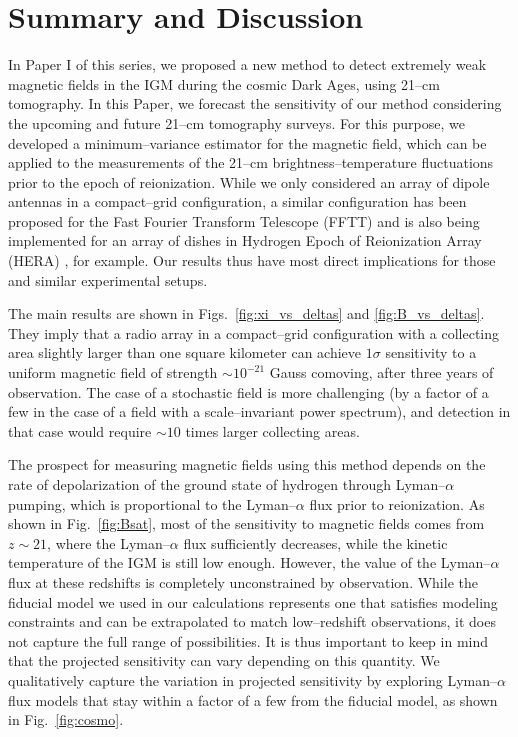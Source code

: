 \section{Summary and Discussion}
\label{sec:conclusions}

In Paper I of this series, we proposed a new method to detect extremely weak magnetic fields in the IGM during the cosmic Dark Ages, using 21--cm tomography. In this Paper, we forecast the sensitivity of our method considering the upcoming and future 21--cm tomography surveys. For this purpose, we developed a minimum--variance estimator for the magnetic field, which can be applied to the measurements of the 21--cm brightness--temperature fluctuations prior to the epoch of reionization. While we only considered an array of dipole antennas in a compact--grid configuration, a similar configuration has been proposed for the Fast Fourier Transform Telescope (FFTT) \cite{2009PhRvD..79h3530T} and is also being implemented for an array of dishes in Hydrogen Epoch of Reionization Array (HERA) \cite{2015AAS...22532803D}, for example. Our results thus have most direct implications for those and similar experimental setups.

The main results are shown in Figs.~\ref{fig:xi_vs_deltas} and \ref{fig:B_vs_deltas}. They imply that a radio array in a compact--grid configuration with a collecting area slightly larger than one square kilometer can achieve $1\sigma$ sensitivity to a uniform magnetic field of strength $\sim10^{-21}$ Gauss comoving, after three years of observation. The case of a stochastic field is more challenging (by a factor of a few in the case of a field with a scale--invariant power spectrum), and detection in that case would require $\sim 10$ times larger collecting areas.

The prospect for measuring magnetic fields using this method depends on the rate of depolarization of the ground state of hydrogen through Lyman--$\alpha$ pumping, which is proportional to the Lyman--$\alpha$ flux prior to reionization. As shown in Fig.~\ref{fig:Bsat}, most of the sensitivity to magnetic fields comes from $z\sim 21$, where the Lyman--$\alpha$ flux sufficiently decreases, while the kinetic temperature of the IGM is still low enough. However, the value of the Lyman--$\alpha$ flux at these redshifts is completely unconstrained by observation. While the fiducial model we used in our calculations represents one that satisfies modeling constraints and can be extrapolated to match low--redshift observations, it does not capture the full range of possibilities. It is thus important to keep in mind that the projected sensitivity can vary depending on this quantity. We qualitatively capture the variation in projected sensitivity by exploring Lyman--$\alpha$ flux models that stay within a factor of a few from the fiducial model, as shown in Fig.~\ref{fig:cosmo}.

